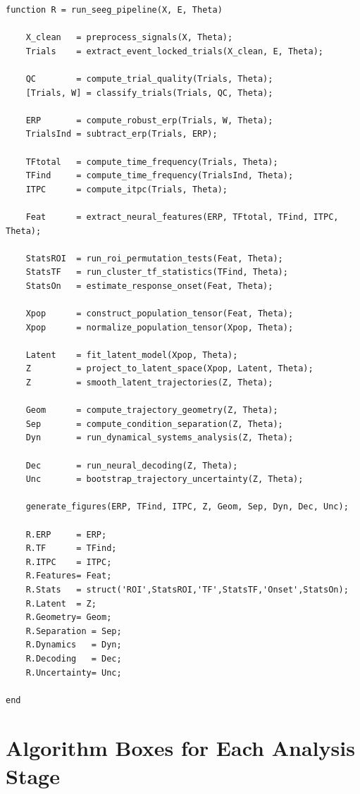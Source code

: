 \documentclass[11pt]{report}
\begin{document}
\begin{verbatim}
function R = run_seeg_pipeline(X, E, Theta)

    X_clean   = preprocess_signals(X, Theta);
    Trials    = extract_event_locked_trials(X_clean, E, Theta);

    QC        = compute_trial_quality(Trials, Theta);
    [Trials, W] = classify_trials(Trials, QC, Theta);

    ERP       = compute_robust_erp(Trials, W, Theta);
    TrialsInd = subtract_erp(Trials, ERP);

    TFtotal   = compute_time_frequency(Trials, Theta);
    TFind     = compute_time_frequency(TrialsInd, Theta);
    ITPC      = compute_itpc(Trials, Theta);

    Feat      = extract_neural_features(ERP, TFtotal, TFind, ITPC, Theta);

    StatsROI  = run_roi_permutation_tests(Feat, Theta);
    StatsTF   = run_cluster_tf_statistics(TFind, Theta);
    StatsOn   = estimate_response_onset(Feat, Theta);

    Xpop      = construct_population_tensor(Feat, Theta);
    Xpop      = normalize_population_tensor(Xpop, Theta);

    Latent    = fit_latent_model(Xpop, Theta);
    Z         = project_to_latent_space(Xpop, Latent, Theta);
    Z         = smooth_latent_trajectories(Z, Theta);

    Geom      = compute_trajectory_geometry(Z, Theta);
    Sep       = compute_condition_separation(Z, Theta);
    Dyn       = run_dynamical_systems_analysis(Z, Theta);

    Dec       = run_neural_decoding(Z, Theta);
    Unc       = bootstrap_trajectory_uncertainty(Z, Theta);

    generate_figures(ERP, TFind, ITPC, Z, Geom, Sep, Dyn, Dec, Unc);

    R.ERP     = ERP;
    R.TF      = TFind;
    R.ITPC    = ITPC;
    R.Features= Feat;
    R.Stats   = struct('ROI',StatsROI,'TF',StatsTF,'Onset',StatsOn);
    R.Latent  = Z;
    R.Geometry= Geom;
    R.Separation = Sep;
    R.Dynamics   = Dyn;
    R.Decoding   = Dec;
    R.Uncertainty= Unc;

end
\end{verbatim}

\chapter{Algorithm Boxes for Each Analysis Stage}
\end{document}
